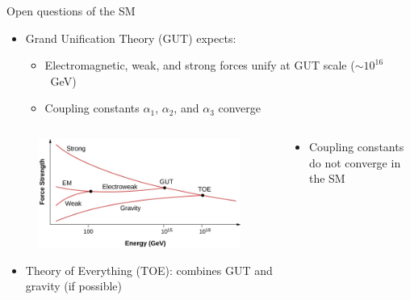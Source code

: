 \documentclass[10pt]{beamer}
\begin{document}
\begin{frame}{Open questions of the SM}
    \begin{itemize}
        \item Grand Unification Theory (GUT) expects:
        \begin{itemize}
            \item Electromagnetic, weak, and strong forces unify at GUT scale ($\sim 10^{16}$~GeV)
            \item Coupling constants $\alpha_{1}$, $\alpha_{2}$, and $\alpha_{3}$ converge
        \end{itemize}
    \end{itemize}
    \begin{columns}
        \begin{column}{0.6\textwidth}
            \vspace{-1cm}
            \begin{figure}
                \includegraphics[scale=0.7]{figures/GUT.jpg}
            \end{figure}
            \begin{itemize}
                \item Theory of Everything (TOE): combines GUT and gravity (if possible)
            \end{itemize}
        \end{column}
        \begin{column}{0.4\textwidth}
            \begin{itemize}
                \item Coupling constants do not converge in the SM
            \end{itemize}
             \begin{figure}

\end{figure}
\end{column}
\end{columns}
\end{frame}
\end{document}
